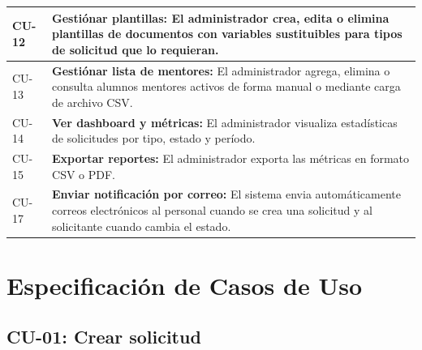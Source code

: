 \begin{longtable}{|C{1.2cm}|L{12.5cm}|}
    \hline
    CU-12 & \textbf{Gestiónar plantillas:} El administrador crea, edita o elimina plantillas de documentos con variables sustituibles para tipos de solicitud que lo requieran. \\
    \hline
    CU-13 & \textbf{Gestiónar lista de mentores:} El administrador agrega, elimina o consulta alumnos mentores activos de forma manual o mediante carga de archivo CSV. \\
    \hline
    CU-14 & \textbf{Ver dashboard y métricas:} El administrador visualiza estadísticas de solicitudes por tipo, estado y período. \\
    \hline
    CU-15 & \textbf{Exportar reportes:} El administrador exporta las métricas en formato CSV o PDF. \\
    \hline
    CU-17 & \textbf{Enviar notificación por correo:} El sistema envia automáticamente correos electrónicos al personal cuando se crea una solicitud y al solicitante cuando cambia el estado. \\
    \hline
\end{longtable}

\section{Especificación de Casos de Uso}

\subsection{CU-01: Crear solicitud}


